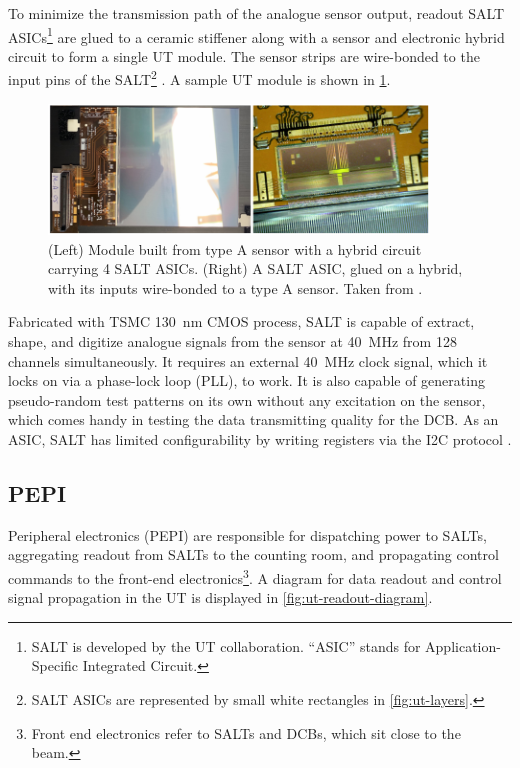 To minimize the transmission path of the analogue sensor output, readout
SALT ASICs\footnote{
    SALT is developed by the UT collaboration.
    ``ASIC'' stands for Application-Specific Integrated Circuit.
} are glued to a ceramic stiffener along with a sensor and electronic hybrid
circuit to form a single UT module.
The sensor strips are wire-bonded to the input pins of the SALT\footnote{
    SALT ASICs are represented by small white rectangles in
    \cref{fig:ut-layers}.
}
\cite{Wang:2015mem}.
A sample UT module is shown in \cref{fig:ut-module}.

\begin{figure}[!htb]
    \centering
    \includegraphics[width=0.9\textwidth]{./figs-ut-upgrade/stave/ut_sensor_module.pdf}
    \caption{
        (Left) Module built from type A sensor with a hybrid circuit carrying
        4 SALT ASICs.
        (Right) A SALT ASIC, glued on a hybrid, with its inputs wire-bonded
        to a type A sensor.
        Taken from \cite{Carli:2783293}.
    }
    \label{fig:ut-module}
\end{figure}

Fabricated with TSMC 130~nm CMOS process, SALT is capable of extract, shape,
and digitize analogue signals from the sensor at 40~MHz from 128 channels
simultaneously.
It requires an external 40~MHz clock signal,
which it locks on via a phase-lock loop (PLL),
to work.
It is also capable of generating pseudo-random test patterns on its own without
any excitation on the sensor, which comes handy in testing the data transmitting
quality for the DCB.
As an ASIC, SALT has limited configurability by writing registers via the I2C
protocol \cite{s22010107}.


\subsection{PEPI}
\label{ref:ut:overview:pepi}

Peripheral electronics (PEPI) are responsible for dispatching power to SALTs,
aggregating readout from SALTs to the counting room,
and propagating control commands to the front-end electronics\footnote{
    Front end electronics refer to SALTs and DCBs, which sit close to the beam.
}.
A diagram for data readout and control signal propagation in the UT is displayed
in
\cref{fig:ut-readout-diagram}.

